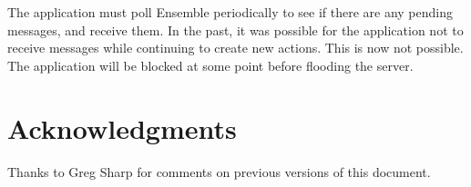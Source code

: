 \documentclass[11pt]{article}
\begin{document}
The application must poll Ensemble periodically to see if there are any
pending messages, and receive them. In the past, it was possible
for the application not to receive messages while continuing to create
new actions. This is now not possible. The application will be blocked
at some point before flooding the server. 


%


\section*{Acknowledgments}
Thanks to Greg Sharp for comments on previous versions of this document.
\end{document}

